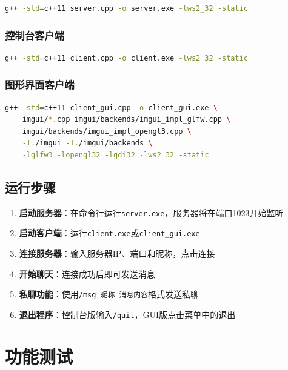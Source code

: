 \documentclass[12pt, a4paper]{article}
\newcommand{\cmd}[1]{\texttt{#1}}
\begin{document}
\begin{lstlisting}[language=bash]
g++ -std=c++11 server.cpp -o server.exe -lws2_32 -static
\end{lstlisting}

\subsubsection{控制台客户端}

\begin{lstlisting}[language=bash]
g++ -std=c++11 client.cpp -o client.exe -lws2_32 -static
\end{lstlisting}

\subsubsection{图形界面客户端}

\begin{lstlisting}[language=bash]
g++ -std=c++11 client_gui.cpp -o client_gui.exe \
    imgui/*.cpp imgui/backends/imgui_impl_glfw.cpp \
    imgui/backends/imgui_impl_opengl3.cpp \
    -I./imgui -I./imgui/backends \
    -lglfw3 -lopengl32 -lgdi32 -lws2_32 -static
\end{lstlisting}

\subsection{运行步骤}

\begin{enumerate}[itemsep=3pt]
  \item \textbf{启动服务器}：在命令行运行\cmd{server.exe}，服务器将在端口1023开始监听
  \item \textbf{启动客户端}：运行\cmd{client.exe}或\cmd{client\_gui.exe}
  \item \textbf{连接服务器}：输入服务器IP、端口和昵称，点击连接
  \item \textbf{开始聊天}：连接成功后即可发送消息
  \item \textbf{私聊功能}：使用\cmd{/msg 昵称 消息内容}格式发送私聊
  \item \textbf{退出程序}：控制台版输入\cmd{/quit}，GUI版点击菜单中的退出
\end{enumerate}



\section{功能测试}
\end{document}
